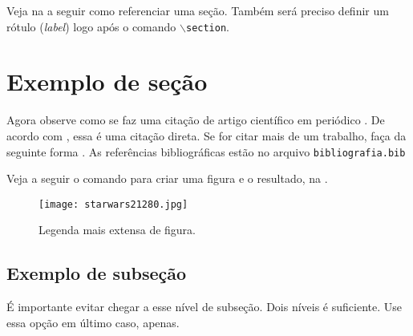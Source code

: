 Veja na  a seguir como referenciar uma seção. Também será preciso definir um rótulo (\textit{label}) logo após o comando \texttt{$\backslash$section}.

\section{Exemplo de seção}\label{sec:exemplo_secao} 
Agora observe como se faz uma citação de artigo científico em periódico \cite{Gradvohl2014c}. De acordo com \textcite{Gradvohl2016}, essa é uma citação direta. Se for citar mais de um trabalho, faça da seguinte forma \cite{ZAMBON2015, Gradvohl2015}. As referências bibliográficas estão no arquivo \texttt{bibliografia.bib}

Veja a seguir o comando para criar uma figura e o resultado, na .

\begin{figure}[!htb]
\centering
\texttt{[image: starwars21280.jpg]}
\caption[Legenda curta de figura]{Legenda mais extensa de figura.}
\label{fig:xwing}
\end{figure}

\subsection{Exemplo de subseção}
É importante evitar chegar a esse nível de subseção. Dois níveis é suficiente. Use essa opção em último caso, apenas.

\lipsum[5]
